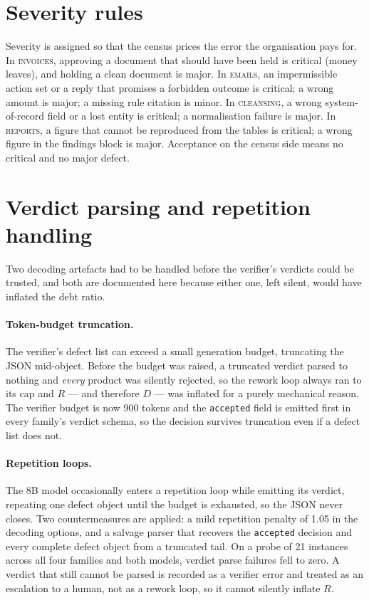 \documentclass[11pt]{article}
\newcommand{\famname}[1]{\textsc{#1}}
\begin{document}
\section{Severity rules}
\label{app:severity}
Severity is assigned so that the census prices the error the organisation pays for. In
\famname{invoices}, approving a document that should have been held is critical (money leaves), and
holding a clean document is major. In \famname{emails}, an impermissible action set or a reply that
promises a forbidden outcome is critical; a wrong amount is major; a missing rule citation is
minor. In \famname{cleansing}, a wrong system-of-record field or a lost entity is critical; a
normalisation failure is major. In \famname{reports}, a figure that cannot be reproduced from the
tables is critical; a wrong figure in the findings block is major. Acceptance on the census side
means no critical and no major defect.

\section{Verdict parsing and repetition handling}
\label{app:repeats}

Two decoding artefacts had to be handled before the verifier's verdicts could be trusted, and both
are documented here because either one, left silent, would have inflated the debt ratio.

\paragraph{Token-budget truncation.} The verifier's defect list can exceed a small generation
budget, truncating the JSON mid-object. Before the budget was raised, a truncated verdict parsed to
nothing and \emph{every} product was silently rejected, so the rework loop always ran to its cap and
$R$ --- and therefore $D$ --- was inflated for a purely mechanical reason. The verifier budget is now
900 tokens and the \texttt{accepted} field is emitted first in every family's verdict schema, so the
decision survives truncation even if a defect list does not.

\paragraph{Repetition loops.} The 8B model occasionally enters a repetition loop while emitting its
verdict, repeating one defect object until the budget is exhausted, so the JSON never closes. Two
countermeasures are applied: a mild repetition penalty of 1.05 in the decoding options, and a
salvage parser that recovers the \texttt{accepted} decision and every complete defect object from a
truncated tail. On a probe of 21 instances across all four families and both models, verdict parse
failures fell to zero. A verdict that still cannot be parsed is recorded as a verifier error and
treated as an escalation to a human, not as a rework loop, so it cannot silently inflate $R$.
\end{document}
